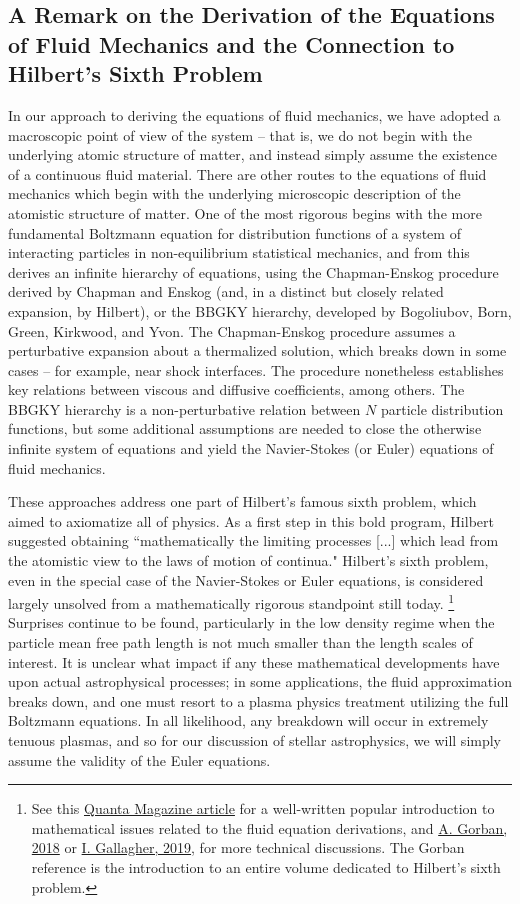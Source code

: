 \documentclass[notoc]{tufte-handout}
\begin{document}
\subsection{A Remark on the Derivation of the Equations of Fluid Mechanics and the Connection to Hilbert's Sixth Problem}


In our approach to deriving the equations of fluid mechanics, we have adopted a macroscopic point of view of the system -- that is, we do not begin with the underlying atomic structure of matter, and instead simply assume the existence of a continuous fluid material.  There are other routes to the equations of fluid mechanics which begin with the underlying microscopic description of the atomistic structure of matter. One of the most rigorous begins with the more fundamental Boltzmann equation for distribution functions of a system of interacting particles in non-equilibrium statistical mechanics, and from this derives an infinite hierarchy of equations,  using the Chapman-Enskog procedure derived by Chapman and Enskog (and, in a distinct but closely related expansion, by Hilbert), or the BBGKY hierarchy, developed by Bogoliubov, Born, Green, Kirkwood, and Yvon. The Chapman-Enskog procedure assumes a perturbative expansion about a thermalized solution, which breaks down in some cases -- for example, near shock interfaces. The procedure nonetheless establishes key relations between viscous and diffusive coefficients, among others. The BBGKY hierarchy is a non-perturbative relation between $N$ particle distribution functions, but some additional assumptions are needed to close the otherwise infinite system of equations and yield the Navier-Stokes (or Euler) equations of fluid mechanics.

These approaches address one part of  Hilbert's famous sixth problem, which aimed to axiomatize all of physics.  As a first step in this bold program, Hilbert suggested obtaining ``mathematically the limiting processes [...] which lead from the atomistic view to the laws of motion of continua." Hilbert's sixth problem, even in the special case of the Navier-Stokes or Euler equations, is considered largely unsolved from a mathematically rigorous standpoint still today. \footnote {See this \href{https://www.quantamagazine.org/famous-fluid-equations-are-incomplete-20150721/} {Quanta Magazine article} for a well-written popular introduction to mathematical issues related to the fluid equation derivations, and \href {https://arxiv.org/abs/1803.03599} {A. Gorban, 2018} or \href {https://doi.org/10.1090/bull/1650 }{I. Gallagher, 2019}, for more technical discussions. The Gorban reference is the introduction to an entire volume dedicated to Hilbert's sixth problem.}  Surprises continue to be found, particularly in the low density regime when the particle mean free path length is not much smaller than the length scales of interest. It is unclear what impact if any these mathematical developments have upon actual astrophysical processes; in some applications, the fluid approximation breaks down, and one must resort to a plasma physics treatment utilizing the full Boltzmann equations. In all likelihood, any breakdown will occur in extremely tenuous plasmas, and so for our discussion of stellar astrophysics, we will simply assume the validity of the Euler equations.
\end{document}
